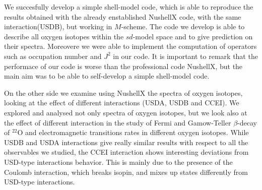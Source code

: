 We succesfully develop a simple shell-model code, which is able to reproduce the results obtained with the already enstablished NushellX code,  with the same interaction(USDB), but working in $M$-scheme.
The code we develop is able to describe all oxygen isotopes within the $sd$-model space and to give prediction on their spectra. Moreovere we were able to implement the computation of operators such as occupation number and $J^2$ in our code.
It is important to remark that the performace of our code is worse than the professional code NushellX, but the main aim was to be able to self-develop a simple shell-model code.

On the other side we examine using NushellX the spectra of oxygen isotopes, looking at the effect of different interactions (USDA, USDB and CCEI).
We explored and analysed not only spectra of oxygen isotopes, but we look also at the effect of different interaction in the study of Fermi and Gamow-Teller $\beta$-decay of $^{22}$O and electromagnetic transitions rates in different oxygen isotopes.
While USDB and USDA interactions give really similar results with respect to all the observables we studied, the CCEI interaction shows interesting deviations from USD-type interactions behavior.
This is mainly due to the presence of the Coulomb interaction, which breaks isopin, and mixes up states differently from USD-type interactions.

